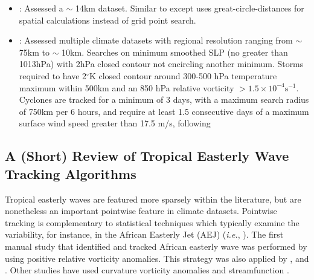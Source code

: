\documentclass[gmdd, hvmath, online]{copernicus_discussions}
\begin{document}
\begin{itemize}
\item \cite{bosler2016stride}:  Assessed a $\sim$ 14km dataset. Similar to \cite{knutson2007simulation, zhao2009simulations} except uses great-circle-distances for spatial calculations instead of grid point search.

\item \cite{harris2016hiram}:  Assessed multiple climate datasets with regional resolution ranging from $\sim$ 75km to $\sim$ 10km. Searches on minimum smoothed SLP (no greater than 1013hPa) with 2hPa closed contour not encircling another minimum. Storms required to have 2$^\circ$K closed contour around 300-500 hPa temperature maximum within 500km and an 850 hPa relative vorticity $> 1.5 \times 10^{-4} \mbox{s}^{-1}$. Cyclones are tracked for a minimum of 3 days, with a maximum search radius of 750km per 6 hours, and require at least 1.5 consecutive days of a maximum surface wind speed greater than 17.5 m/s, following \citet{chen2011predictability}

\end{itemize}

\subsection{A (Short) Review of Tropical Easterly Wave Tracking Algorithms} \label{sec:TropicalEasterlyWaveAlgorithms}


Tropical easterly waves are featured more sparsely within the literature, but are nonetheless an important pointwise feature in climate datasets.  Pointwise tracking is complementary to statistical techniques which typically examine the variability, for instance, in the African Easterly Jet (AEJ) (\textit{i.e.}, \cite{ceron1999validation}).  The first manual study that identified and tracked African easterly wave was performed by \cite{reed1988evaluation} using positive relative vorticity anomalies.  This strategy was also applied by \cite{thorncroft2001african}, \cite{hodges2003comparison} and \cite{serra2010tracking}.  Other studies have used curvature vorticity anomalies \cite{belanger2014african, bain2014objective} and streamfunction \citep{berry2007african}.%

\end{document}
